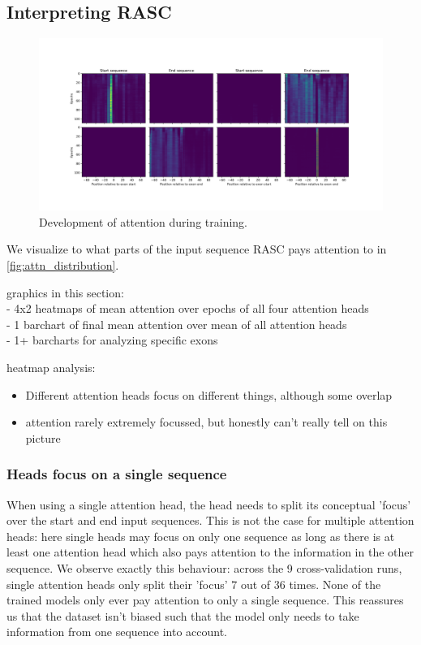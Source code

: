 \subsection{Interpreting RASC} \label{subsubsec:attn_interpretation}


\begin{figure}
	\centering\includegraphics[width=1\textwidth]{../visualizations/ch5-results/attention_heatmap.png} 
	\caption{Development of attention during training. }
	\label{fig:attn_heatmap}
\end{figure}

We visualize to what parts of the input sequence RASC pays attention to in \ref{fig:attn_distribution}. %

graphics in this section:\\
- 4x2 heatmaps of mean attention over epochs of all four attention heads\\
- 1 barchart of final mean attention over mean of all attention heads\\
- 1+ barcharts for analyzing specific exons

heatmap analysis:
\begin{itemize}
	\item Different attention heads focus on different things, although some overlap
	\item attention rarely extremely focussed, but honestly can't really tell on this picture
\end{itemize}

\subsubsection{Heads focus on a single sequence} 
When using a single attention head, the head needs to split its conceptual 'focus' over the start and end input sequences. This is not the case for multiple attention heads: here single heads may focus on only one sequence as long as there is at least one attention head which also pays attention to the information in the other sequence. We observe exactly this behaviour: across the 9 cross-validation runs, single attention heads only split their 'focus' 7 out of 36 times. None of the trained models only ever pay attention to only a single sequence. This reassures us that the dataset isn't biased such that the model only needs to take information from one sequence into account. 

